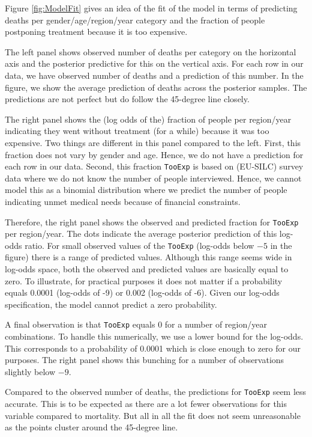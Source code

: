 \documentclass[a4paper,12pt]{article}
\begin{document}
Figure \ref{fig:ModelFit} gives an idea of the fit of the model in terms of predicting deaths per gender/age/region/year category and the fraction of people postponing treatment because it is too expensive.

The left panel shows observed number of deaths per category on the horizontal axis and the posterior predictive for this on the vertical axis. For each row in our data, we have observed number of deaths and a prediction of this number. In the figure, we show the average prediction of deaths across the posterior samples. The predictions are not perfect but do follow the 45-degree line closely.

The right panel shows the (log odds of the) fraction of people per region/year indicating they went without treatment (for a while) because it was too expensive. Two things are different in this panel compared to the left. First, this fraction does not vary by gender and age. Hence, we do not have a prediction for each row in our data. Second, this fraction \texttt{TooExp} is based on (EU-SILC) survey data where we do not know the number of people interviewed. Hence, we cannot model this as a binomial distribution where we predict the number of people indicating unmet medical needs because of financial constraints.

Therefore, the right panel shows the observed and predicted fraction for \texttt{TooExp} per region/year. The dots indicate the average posterior prediction of this log-odds ratio. For small observed values of the \texttt{TooExp} (log-odds below \(-5\) in the figure) there is a range of predicted values. Although this range seems wide in log-odds space, both the observed and predicted values are basically equal to zero. To illustrate, for practical purposes it does not matter if a probability equals 0.0001 (log-odds of -9) or 0.002 (log-odds of -6). Given our log-odds specification, the model cannot predict a zero probability.

A final observation is that \texttt{TooExp} equals 0 for a number of region/year combinations. To handle this numerically, we use a lower bound for the log-odds. This corresponds to a probability of 0.0001 which is close enough to zero for our purposes. The right panel shows this bunching for a number of observations slightly below \(-9\).

Compared to the observed number of deaths, the predictions for \texttt{TooExp} seem less accurate. This is to be expected as there are a lot fewer observations for this variable compared to mortality. But all in all the fit does not seem unreasonable as the points cluster around the 45-degree line.
\end{document}
